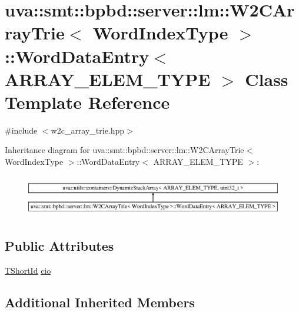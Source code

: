 \hypertarget{classuva_1_1smt_1_1bpbd_1_1server_1_1lm_1_1_w2_c_array_trie_1_1_word_data_entry}{}\section{uva\+:\+:smt\+:\+:bpbd\+:\+:server\+:\+:lm\+:\+:W2\+C\+Array\+Trie$<$ Word\+Index\+Type $>$\+:\+:Word\+Data\+Entry$<$ A\+R\+R\+A\+Y\+\_\+\+E\+L\+E\+M\+\_\+\+T\+Y\+P\+E $>$ Class Template Reference}
\label{classuva_1_1smt_1_1bpbd_1_1server_1_1lm_1_1_w2_c_array_trie_1_1_word_data_entry}


{\ttfamily \#include $<$w2c\+\_\+array\+\_\+trie.\+hpp$>$}

Inheritance diagram for uva\+:\+:smt\+:\+:bpbd\+:\+:server\+:\+:lm\+:\+:W2\+C\+Array\+Trie$<$ Word\+Index\+Type $>$\+:\+:Word\+Data\+Entry$<$ A\+R\+R\+A\+Y\+\_\+\+E\+L\+E\+M\+\_\+\+T\+Y\+P\+E $>$\+:\begin{figure}[H]
\begin{center}
\leavevmode
\includegraphics[height=1.869783cm]{classuva_1_1smt_1_1bpbd_1_1server_1_1lm_1_1_w2_c_array_trie_1_1_word_data_entry}
\end{center}
\end{figure}
\subsection*{Public Attributes}
\begin{DoxyCompactItemize}
\item 
\hyperlink{namespaceuva_1_1smt_1_1bpbd_1_1server_1_1lm_1_1identifiers_a33043a191e9a637dea742a89d23c8bdc}{T\+Short\+Id} \hyperlink{classuva_1_1smt_1_1bpbd_1_1server_1_1lm_1_1_w2_c_array_trie_1_1_word_data_entry_a3498c85d0892cefdb2211764e0fd151f}{cio}
\end{DoxyCompactItemize}
\subsection*{Additional Inherited Members}


